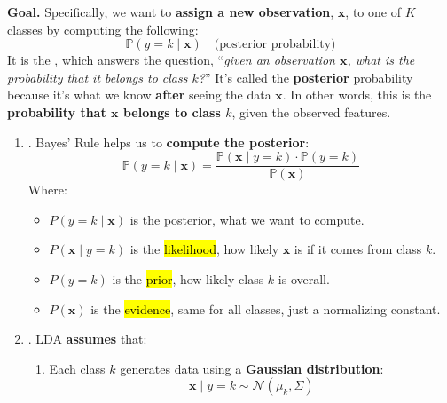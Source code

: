 \highspace
\textcolor{Red2}{ \textbf{Goal.}} Specifically, we want to \textbf{assign a new observation}, $\mathbf{x}$, to one of $K$ classes by computing the following:
\begin{equation}\label{eq: posterior probability}
    \mathbb{P}(y = k \mid \mathbf{x}) \quad \text{(posterior probability)}
\end{equation}
It is the , which answers the question, ``\emph{given an observation $\mathbf{x}$, what is the probability that it belongs to class $k$?}'' It's called the \textbf{posterior} probability because it's what we know \textbf{after} seeing the data $\mathbf{x}$. In other words, this is the \textbf{probability that $\mathbf{x}$ belongs to class $k$}, given the observed features.
\begin{enumerate}
    \item {}. Bayes' Rule helps us to \textbf{compute the posterior}:
    \begin{equation*}\label{eq: bayes rule - lda}
        \mathbb{P}\left(y = k \mid \mathbf{x}\right) = \frac{\mathbb{P}\left(\mathbf{x} \mid y = k\right) \cdot \mathbb{P}\left(y = k\right)}{\mathbb{P}(\mathbf{x})}
    \end{equation*}
    Where:
    \begin{itemize}
        \item $P\left(y = k \mid \mathbf{x}\right)$ is the posterior, what we want to compute.
        \item $P\left(\mathbf{x} \mid y = k\right)$ is the \hl{likelihood}, how likely $\mathbf{x}$ is if it comes from class $k$.
        \item $P\left(y = k\right)$ is the \hl{prior}, how likely class $k$ is overall.
        \item $P\left(\mathbf{x}\right)$ is the \hl{evidence}, same for all classes, just a normalizing constant.
    \end{itemize}


    \item {}. LDA \textbf{assumes} that:
    \begin{enumerate}
        \item Each class $k$ generates data using a \textbf{Gaussian distribution}:
        \begin{equation*}
            \mathbf{x} \mid y = k \sim \mathcal{N}(\mu_{k}, \Sigma)
        \end{equation*}
        

\end{enumerate}
\end{enumerate}
